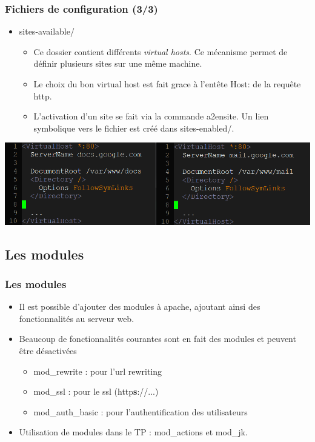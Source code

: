 \begin{frame}
	\frametitle{Fichiers de configuration (3/3)}
	\begin{itemize}
	      \item sites-available/
	      \begin{itemize}
		 	\item Ce dossier contient différents \textit{virtual hosts}. Ce mécanisme permet de définir plusieurs sites sur une même machine. 
		  	\item Le choix du bon virtual host est fait grace à l'entête \og{} Host: \fg{} de la requête http.
		  	\item L'activation d'un site se fait via la commande a2ensite. Un lien symbolique vers le fichier est créé dans sites-enabled/.
	      \end{itemize}
	\end{itemize}
	\begin{center}
		\includegraphics[scale=0.4]{Images/sites-available.png}
	\end{center}
\end{frame}

\subsection{Les modules}

\begin{frame}
	\frametitle{Les modules}
	\begin{itemize}
	  \item Il est possible d'ajouter des modules à apache, ajoutant ainsi des fonctionnalités au serveur web. 
	  \item Beaucoup de fonctionnalités courantes sont en fait des modules et peuvent être désactivées
	  \begin{itemize}
	  	\item mod\_rewrite : pour l'url rewriting
	  	\item mod\_ssl : pour le ssl (http\textbf{s}://...)
	  	\item mod\_auth\_basic : pour l'authentification des utilisateurs
	  \end{itemize}
	  \item Utilisation de modules dans le TP : mod\_actions et mod\_jk.
	\end{itemize}
\end{frame}

